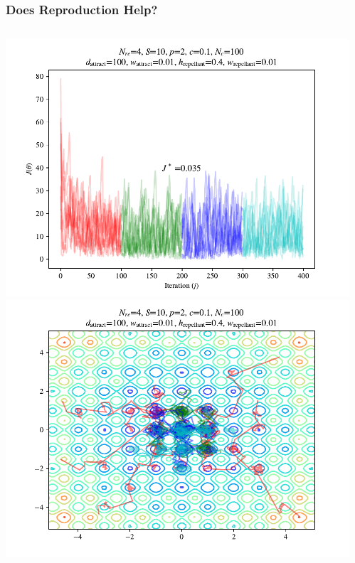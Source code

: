 \documentclass{beamer}
\begin{document}
\begin{frame}
\frametitle{Does Reproduction Help?}
\begin{columns}[T]
    \begin{center}
      \includegraphics[scale=0.3]{assets/rastrigin_colony_re_J}
      \includegraphics[scale=0.3]{assets/rastrigin_colony_re_theta}
    \end{center}
  \begin{center}

\end{center}
\end{columns}
\end{frame}
\end{document}
